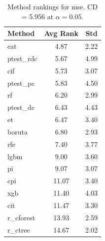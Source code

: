 \begin{table}[h]
\centering
\caption{Method rankings for mse. CD = 5.956 at $\alpha=0.05$.}
\label{tab:ranks_mse}
\begin{tabular}{lcc}
\toprule
Method & Avg Rank & Std \\
\midrule
cat & 4.87 & 2.22 \\
ptest_rdc & 5.67 & 4.99 \\
cif & 5.73 & 3.07 \\
ptest_pc & 5.83 & 4.50 \\
rf & 6.20 & 2.99 \\
ptest_dc & 6.43 & 4.43 \\
et & 6.47 & 3.40 \\
boruta & 6.80 & 2.93 \\
rfe & 7.40 & 3.77 \\
lgbm & 9.00 & 3.60 \\
pi & 9.07 & 3.07 \\
cpi & 11.07 & 3.40 \\
xgb & 11.40 & 4.03 \\
cit & 11.47 & 3.30 \\
r_cforest & 13.93 & 2.59 \\
r_ctree & 14.67 & 2.02 \\
\bottomrule
\end{tabular}
\end{table}